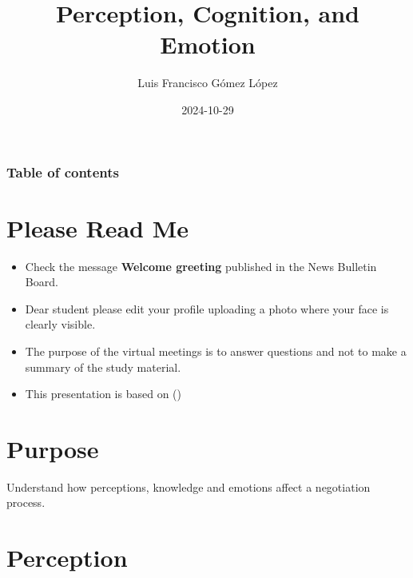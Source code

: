 \documentclass[
  ignorenonframetext,
]{beamer}
\title{Perception, Cognition, and Emotion}
\author{Luis Francisco Gómez López}
\date{2024-10-29}
\institute{FAEDIS}
\renewcommand*\contentsname{Table of contents}
\newcommand\contentsname{Table of contents}
\begin{document}
\frame{\titlepage}

\renewcommand*\contentsname{Table of contents}
\begin{frame}[allowframebreaks]
  \frametitle{Table of contents}
  \tableofcontents[hideallsubsections]
\end{frame}

\section{Please Read Me}\label{please-read-me}

\begin{frame}{}
\label{section}
\begin{itemize}
\item
  Check the message \textbf{Welcome greeting} published in the News
  Bulletin Board.
\item
  Dear student please edit your profile uploading a photo where your
  face is clearly visible.
\item
  The purpose of the virtual meetings is to answer questions and not to
  make a summary of the study material.
\item
  This presentation is based on
  ()
\end{itemize}
\end{frame}

\section{Purpose}\label{purpose}

\begin{frame}{}
\label{section-1}
Understand how perceptions, knowledge and emotions affect a negotiation
process.
\end{frame}

\section{Perception}\label{perception}
\end{document}
